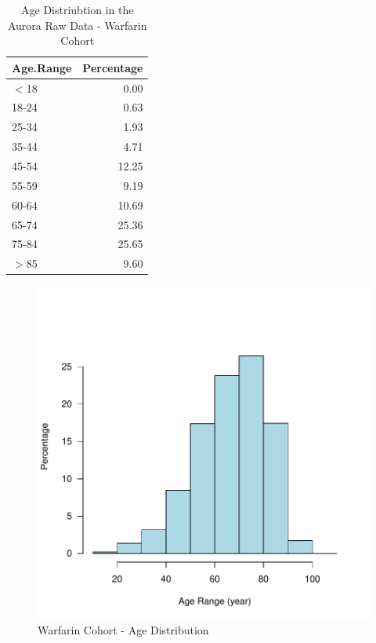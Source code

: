 \documentclass{article}
\begin{document}
\begin{table}[ht]
\centering
\begin{tabular}{lr}
  \hline
Age.Range & Percentage \\ 
  \hline
$<$18 & 0.00 \\ 
  18-24 & 0.63 \\ 
  25-34 & 1.93 \\ 
  35-44 & 4.71 \\ 
  45-54 & 12.25 \\ 
  55-59 & 9.19 \\ 
  60-64 & 10.69 \\ 
  65-74 & 25.36 \\ 
  75-84 & 25.65 \\ 
  $>$85 & 9.60 \\ 
   \hline
\end{tabular}
\caption{Age Distriubtion in the Aurora Raw Data - Warfarin Cohort} 
\label{Table:4}
\end{table}
\begin{figure}
\includegraphics{Fig-fig1}

\caption{Warfarin Cohort - Age Distribution}

\end{figure}
\newpage
\end{document}
